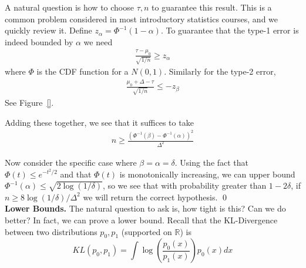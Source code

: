 \documentclass[11pt]{article}
\newcommand{\1}{\mathbf{1}}
\begin{document}
A natural question is how to choose $\tau, n$ to guarantee this result. This is a common problem considered in most introductory statistics courses, and we quickly review it. Define $z_{\alpha} = \Phi^{-1}(1-\alpha)$. To guarantee that the type-1 error is indeed bounded by $\alpha$ we need
\begin{align*}
    \frac{\tau - \mu_0}{\sqrt{1/n}} \geq z_{\alpha} 
\end{align*}
where $\Phi$ is the CDF function for a $N(0,1)$. Similarly for the type-2 error,
\begin{align*}
    \frac{\mu_0+\Delta - \tau}{\sqrt{1/n}} \leq -z_{\beta} 
\end{align*}
See Figure~\ref{}.

Adding these together, we see that it suffices to take
\begin{align*}
    n \geq \frac{(\Phi^{-1}(\beta) - \Phi^{-1}(\alpha))^2}{\Delta^2}
\end{align*}

Now consider the specific case where $\beta = \alpha = \delta$. Using the fact that $\Phi(t) \leq e^{-t^2/2}$ and that $\Phi(t)$ is monotonically increasing, we can upper bound $\Phi^{-1}(\alpha)\leq \sqrt{2\log(1/\delta)}$, so we see that with probability greater than $1-2\delta$, if $n\geq 8\log(1/\delta)/\Delta^2$ we will return the correct hypothesis. \qed\\


\noindent\textbf{Lower Bounds. } The natural question to ask is, how tight is this? Can we do better? In fact, we can prove a lower bound. Recall that the KL-Divergence between two distributions $p_0, p_1$ (supported on $\mathbb{R}$) is 
\begin{equation*}
    KL(p_0, p_1) = \int \log\left(\frac{p_0(x)}{p_1(x)}\right) p_0(x) dx
\end{equation*}
\end{document}
